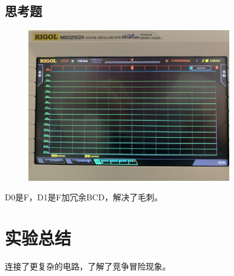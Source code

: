 \documentclass[UTF8, a4paper, 11pt]{article}
\begin{document}
\subsection{思考题}
\begin{figure}[H]
    \centering
    \includegraphics[width=0.8\textwidth]{冗余.JPG}
\end{figure}
D0是F，D1是F加冗余BCD，解决了毛刺。
\section{实验总结}
连接了更复杂的电路，了解了竞争冒险现象。
%
%
\end{document}
